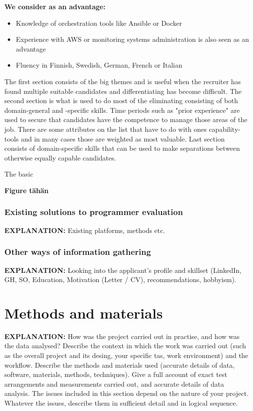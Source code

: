 \documentclass[11pt,a4paper,oneside,article]{memoir}
\begin{document}
\textbf{We consider as an advantage:}
\vspace{-17pt} 
\begin{itemize}
\item Knowledge of orchestration tools like Ansible or Docker
\item Experience with AWS or monitoring systems administration is also seen as an advantage
\item Fluency in Finnish, Swedish, German, French or Italian
\end{itemize}
\vspace{-17pt}


The first section consists of the big themes and is useful when the recruiter has found multiple suitable candidates and differentiating has become difficult. The second section is what is used to do most of the eliminating consisting of both domain-general and -specific skills. Time periods such as "prior experience" are used to secure that candidates have the competence to manage those areas of the job. There are some attributes on the list that have to do with ones capability-tools and in many cases those are weighted as most valuable. Last section consists of domain-specific skills that can be used to make separations between otherwise equally capable candidates.

The basic

\textbf{Figure tähän}

\subsection{Existing solutions to programmer evaluation}
\textbf{EXPLANATION:} Existing platforms, methods etc.

\subsection{Other ways of information gathering}
\textbf{EXPLANATION:} Looking into the applicant’s profile and skillset (LinkedIn, GH, SO, Education, Motivation (Letter / CV), recommendations, hobbyism).
\chapter{Methods and materials}
\textbf{EXPLANATION:} How was the project carried out in practise, and how was the data analysed? Describe the context in which the work was carried out (such as the overall project and its desing, your specific tas, work environment) and the workflow. Describe the methods and materials used (accurate details of data, software, materials, methods, techniques). Give a full account of exact test arrangements and measurements carried out, and accurate details of data analysis. The issues included in this section depend on the nature of your project. Whatever the issues, describe them in sufficient detail and in logical sequence.
\end{document}
